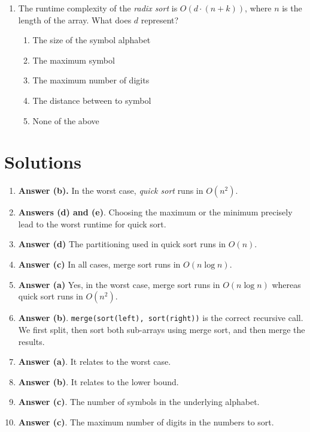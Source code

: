 \documentclass[11pt]{article}
\begin{document}
\begin{enumerate}
\item The runtime complexity of the \emph{radix sort} is \(O(d \cdot
    (n+k))\), where \(n\) is the length of the array. What does \(d\)
represent?
\begin{enumerate}
\item The size of the symbol alphabet
\item The maximum symbol
\item The maximum number of digits
\item The distance between to symbol
\item None of the above
\end{enumerate}
\end{enumerate}


\section{Solutions}
\label{sec:orgee56959}

\begin{enumerate}
\item \textbf{Answer (b).} In the worst case, \emph{quick sort} runs in \(O(n^2)\).

\item \textbf{Answers (d) and (e)}. Choosing the maximum or the minimum
precisely lead to the worst runtime for quick sort.

\item \textbf{Answer (d)} The partitioning used in quick sort runs in \(O(n)\).

\item \textbf{Answer (c)} In all cases, merge sort runs in \(O(n \log n)\).

\item \textbf{Answer (a)} Yes, in the worst case, merge sort runs in \(O(n \log
     n)\) whereas quick sort runs in \(O(n^2)\).

\item \textbf{Answer (b)}. \texttt{merge(sort(left), sort(right))} is the correct
recursive call. We first split, then sort both sub-arrays using
merge sort, and then merge the results.

\item \textbf{Answer (a)}. It relates to the worst case.

\item \textbf{Answer (b)}. It relates to the lower bound.

\item \textbf{Answer (c)}. The number of symbols in the underlying alphabet.

\item \textbf{Answer (c)}. The maximum number of digits in the numbers to
sort.
\end{enumerate}
\end{document}
